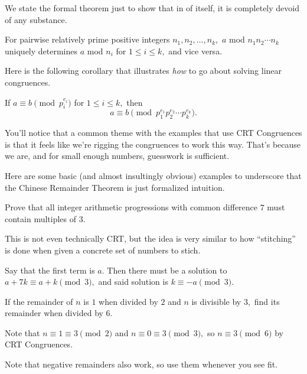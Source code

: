 \documentclass[blue,onecol]{shooting}
\begin{document}
We state the formal theorem just to show that in of itself, it is completely devoid of any substance.

\begin{theo}
For pairwise relatively prime positive integers $n_1,n_2,\ldots,n_k,$ $a$ mod $n_1n_2\cdots n_k$ uniquely determines $a$ mod $n_i$ for $1\leq i\leq k,$ and vice versa.
\end{theo}

Here is the following corollary that illustrates \textit{how} to go about solving linear congruences.

\begin{fact}
If $a\equiv b\pmod{p_i^{e_i}}$ for $1\leq i\leq k,$ then
\[a\equiv b\pmod{p_1^{e_1}p_2^{e_2}\cdots p_k^{e_k}}.\]
\end{fact}

You'll notice that a common theme with the examples that use CRT Congruences is that it feels like we're rigging the congruences to work this way. That's because we are, and for small enough numbers, guesswork is sufficient.

Here are some basic (and almost insultingly obvious) examples to underscore that the Chinese Remainder Theorem is just formalized intuition.

\begin{exam}
Prove that all integer arithmetic progressions with common difference $7$ must contain multiples of $3.$
\end{exam}

This is not even technically CRT, but the idea is very similar to how ``stitching'' is done when given a concrete set of numbers to stich.

\begin{sol}
Say that the first term is $a.$ Then there must be a solution to $a+7k\equiv a+k\pmod{3},$ and said solution is $k\equiv -a\pmod{3}.$
\end{sol}

\begin{exam}
If the remainder of $n$ is $1$ when divided by $2$ and $n$ is divisible by $3,$ find its remainder when divided by $6.$
\end{exam}

\begin{sol}
Note that $n\equiv 1\equiv 3\pmod{2}$ and $n\equiv 0\equiv 3\pmod{3},$ so $n\equiv3\pmod{6}$ by CRT Congruences.
\end{sol}

Note that negative remainders also work, so use them whenever you see fit.
\end{document}
